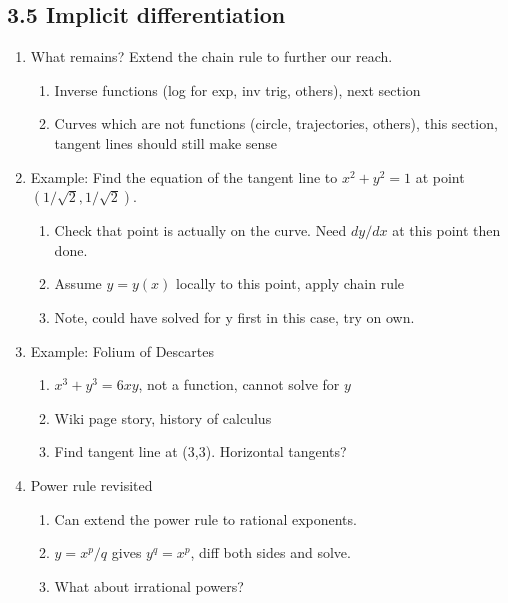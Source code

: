 \documentclass{article}
\begin{document}
\subsection{3.5 Implicit differentiation}
\begin{enumerate}

\item What remains? Extend the chain rule to further our reach.
\begin{enumerate}
\item Inverse functions (log for exp, inv trig, others), next section
\item Curves which are not functions (circle, trajectories, others), this section, tangent lines should still make sense
\end{enumerate}

\item Example: Find the equation of the tangent line to $x^2+y^2=1$ at point $(1/\sqrt{2}, 1/\sqrt{2})$.
\begin{enumerate}
\item Check that point is actually on the curve. Need $dy/dx$ at this point then done.
\item Assume $y = y(x)$ locally to this point, apply chain rule
\item Note, could have solved for y first in this case, try on own.
\end{enumerate}

\item Example: Folium of Descartes
\begin{enumerate}
\item $x^3+y^3=6xy$, not a function, cannot solve for $y$
\item Wiki page story, history of calculus
\item Find tangent line at (3,3). Horizontal tangents?
\end{enumerate}

\item Power rule revisited
\begin{enumerate}
\item Can extend the power rule to rational exponents.
\item $y = x^p/q$ gives $y^q = x^p$, diff both sides and solve.
\item What about irrational powers?
\end{enumerate}


\end{enumerate}
\end{document}

